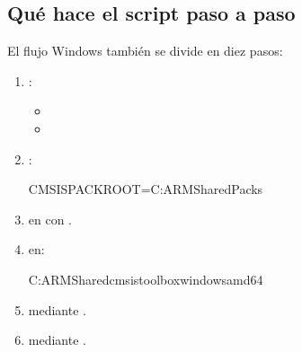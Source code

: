 \documentclass[letterpaper,10pt,english]{sphinxmanual}
\begin{document}
\subsection{Qué hace el script paso a paso}
\label{\detokenize{vscode:id3}}
\sphinxAtStartPar
El flujo Windows también se divide en diez pasos:
\begin{enumerate}
%
\item {} 
\sphinxAtStartPar
{}:
\begin{itemize}
\item {} 
\sphinxAtStartPar
{}

\item {} 
\sphinxAtStartPar
{}

\end{itemize}

\item {} 
\sphinxAtStartPar
{}:

\begin{sphinxVerbatim}[commandchars=\\\{\}]
CMSIS\PYGZus{}PACK\PYGZus{}ROOT=C:\PYGZbs{}ARM\PYGZhy{}Shared\PYGZbs{}Packs
\end{sphinxVerbatim}

\item {} 
\sphinxAtStartPar
{} en  con .

\item {} 
\sphinxAtStartPar
{} en:

\begin{sphinxVerbatim}[commandchars=\\\{\}]
C:\PYGZbs{}ARM\PYGZhy{}Shared\PYGZbs{}cmsis\PYGZhy{}toolbox\PYGZhy{}windows\PYGZhy{}amd64
\end{sphinxVerbatim}

\item {} 
\sphinxAtStartPar
{} mediante .

\item {} 
\sphinxAtStartPar
{} mediante .


\end{enumerate}
\end{document}
